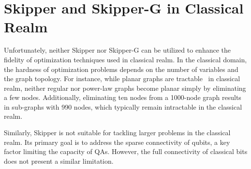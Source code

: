 \section{Skipper and Skipper-G in Classical Realm}

Unfortunately, neither Skipper nor Skipper-G can be utilized to enhance the fidelity of optimization techniques used in classical realm. 
In the classical domain, the hardness of optimization problems depends on the number of variables and the graph topology. 
For instance, while planar graphs are tractable~\cite{dei2006exact,hadlock1975finding} in classical realm, neither regular nor power-law graphs become planar simply by eliminating a few nodes.
Additionally, eliminating ten nodes from a 1000-node graph results in sub-graphs with 990 nodes, which typically remain intractable in the classical realm.

Similarly, Skipper is not suitable for tackling larger problems in the classical realm. 
Its primary goal is to address the sparse connectivity of qubits, a key factor limiting the capacity of QAs. 
However, the full connectivity of classical bits does not present a similar limitation.



